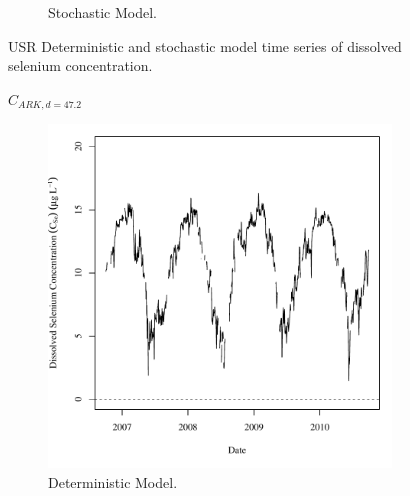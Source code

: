 \begin{linenumbers}
\begin{landscape}
\begin{figure}
\begin{subfigure}{0.7\textwidth}
			\caption{Stochastic Model.}
		\end{subfigure}
		\caption{USR Deterministic and stochastic model time series of dissolved selenium concentration.}
	\end{figure}
\end{landscape}

\subfiguremid
\begin{landscape}
	\begin{figure}
		$ C_{ARK,d=47.2} $
		\begin{subfigure}{0.7\textwidth}
			\centering
			\includegraphics[width=\tableCustomSize]{"Figures/Results_USR/Deterministic/c TS FLY"}
			\caption{Deterministic Model.}
		\end{subfigure}%
		\begin{subfigure}{0.7\textwidth}
			\centering

\end{subfigure}
\end{figure}
\end{landscape}
\end{linenumbers}
